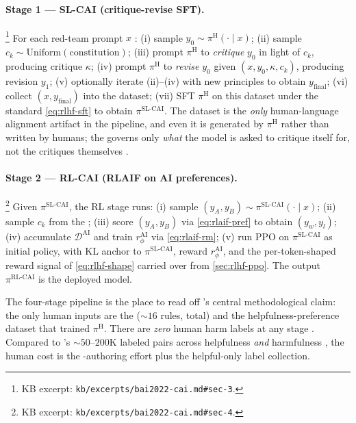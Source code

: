 \paragraph{Stage 1 — SL-CAI (critique-revise SFT).}%
\footnote{KB excerpt: \texttt{kb/excerpts/bai2022-cai.md\#sec-3}.}
For each red-team prompt $x$
\citep[\S 3]{bai2022-cai}: (i) sample $y_0 \sim \pi^{\mathrm{H}}(\cdot
\mid x)$; (ii) sample $c_k \sim \mathrm{Uniform}(\text{constitution})$;
(iii) prompt $\pi^{\mathrm{H}}$ to \emph{critique} $y_0$ in light of
$c_k$, producing critique $\kappa$; (iv) prompt $\pi^{\mathrm{H}}$ to
\emph{revise} $y_0$ given $(x, y_0, \kappa, c_k)$, producing revision
$y_1$; (v) optionally iterate (ii)--(iv) with new principles to obtain
$y_{\mathrm{final}}$; (vi) collect $(x, y_{\mathrm{final}})$ into the
 dataset; (vii) SFT $\pi^{\mathrm{H}}$ on this dataset under
the standard  \cref{eq:rlhf-sft} to obtain
$\pi^{\mathrm{SL\text{-}CAI}}$. The  dataset is the \emph{only}
human-language alignment artifact in the pipeline, and even it is
generated by $\pi^{\mathrm{H}}$ rather than written by humans; the
 governs only \emph{what} the model is asked to critique
itself for, not the critiques themselves \citep[\S 3]{bai2022-cai}.

\paragraph{Stage 2 — RL-CAI (RLAIF on AI preferences).}%
\footnote{KB excerpt: \texttt{kb/excerpts/bai2022-cai.md\#sec-4}.}
Given $\pi^{\mathrm{SL\text{-}CAI}}$, the RL stage \citep[\S
4]{bai2022-cai} runs: (i) sample $(y_A, y_B) \sim
\pi^{\mathrm{SL\text{-}CAI}}(\cdot \mid x)$; (ii) sample $c_k$ from the
; (iii) score $(y_A, y_B)$ via \cref{eq:rlaif-pref} to obtain
$(y_w, y_l)$; (iv) accumulate $\mathcal{D}^{\mathrm{AI}}$ and train
$r_\phi^{\mathrm{AI}}$ via \cref{eq:rlaif-rm}; (v) run PPO on
$\pi^{\mathrm{SL\text{-}CAI}}$ as initial policy, with KL anchor to
$\pi^{\mathrm{SL\text{-}CAI}}$, reward $r_\phi^{\mathrm{AI}}$, and the
per-token-shaped reward signal of \cref{eq:rlhf-shape} carried over
from \cref{sec:rlhf-ppo}. The output $\pi^{\mathrm{RL\text{-}CAI}}$ is
the deployed model.

The four-stage pipeline is the place to read off 's central
methodological claim: the only human inputs are the 
($\sim\!16$ rules, total) and the helpfulness-preference dataset that
trained $\pi^{\mathrm{H}}$. There are \emph{zero} human harm labels at
any stage \citep[\S abstract]{bai2022-cai}. Compared to 's
$\sim\!50\text{--}200$K labeled pairs across helpfulness \emph{and}
harmfulness \citep[\S 3]{ouyang2022-instructgpt}, the  human cost is
the -authoring effort plus the helpful-only label
collection.

